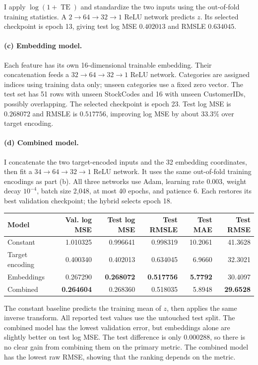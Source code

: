 I apply $\log(1+\operatorname{TE})$ and standardize the two inputs using the out-of-fold training statistics. A $2\to64\to32\to1$ ReLU network predicts $z$. Its selected checkpoint is epoch 13, giving test log MSE $0.402013$ and RMSLE $0.634045$.

\paragraph{(c) Embedding model.} Each feature has its own 16-dimensional trainable embedding. Their concatenation feeds a $32\to64\to32\to1$ ReLU network. Categories are assigned indices using training data only; unseen categories use a fixed zero vector. The test set has 51 rows with unseen StockCodes and 16 with unseen CustomerIDs, possibly overlapping. The selected checkpoint is epoch 23. Test log MSE is $0.268072$ and RMSLE is $0.517756$, improving log MSE by about $33.3\%$ over target encoding.

\newpage
\paragraph{(d) Combined model.} I concatenate the two target-encoded inputs and the 32 embedding coordinates, then fit a $34\to64\to32\to1$ ReLU network. It uses the same out-of-fold training encodings as part (b). All three networks use Adam, learning rate $0.003$, weight decay $10^{-4}$, batch size 2,048, at most 40 epochs, and patience 6. Each restores its best validation checkpoint; the hybrid selects epoch 18.

\begin{center}
\small
\begin{tabular}{lrrrrr}
\toprule
Model & Val. log MSE & Test log MSE & Test RMSLE & Test MAE & Test RMSE\\
\midrule
Constant & 1.010325 & 0.996641 & 0.998319 & 10.2061 & 41.3628\\
Target encoding & 0.400340 & 0.402013 & 0.634045 & 6.9660 & 32.3021\\
Embeddings & 0.267290 & \textbf{0.268072} & \textbf{0.517756} & \textbf{5.7792} & 30.4097\\
Combined & \textbf{0.264604} & 0.268360 & 0.518035 & 5.8948 & \textbf{29.6528}\\
\bottomrule
\end{tabular}
\end{center}
The constant baseline predicts the training mean of $z$, then applies the same inverse transform. All reported test values use the untouched test split. The combined model has the lowest validation error, but embeddings alone are slightly better on test log MSE. The test difference is only $0.000288$, so there is no clear gain from combining them on the primary metric. The combined model has the lowest raw RMSE, showing that the ranking depends on the metric.

